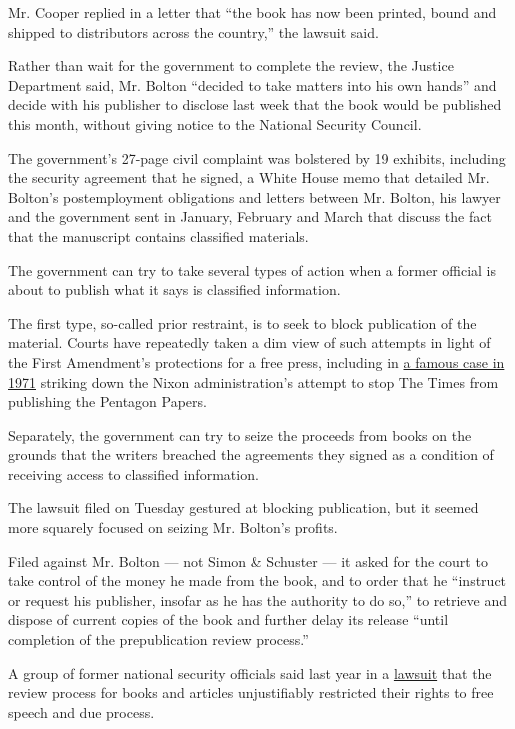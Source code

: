 Mr. Cooper replied in a letter that ``the book has now been printed,
bound and shipped to distributors across the country,'' the lawsuit
said.

Rather than wait for the government to complete the review, the Justice
Department said, Mr. Bolton ``decided to take matters into his own
hands'' and decide with his publisher to disclose last week that the
book would be published this month, without giving notice to the
National Security Council.

The government's 27-page civil complaint was bolstered by 19 exhibits,
including the security agreement that he signed, a White House memo that
detailed Mr. Bolton's postemployment obligations and letters between Mr.
Bolton, his lawyer and the government sent in January, February and
March that discuss the fact that the manuscript contains classified
materials.

The government can try to take several types of action when a former
official is about to publish what it says is classified information.

The first type, so-called prior restraint, is to seek to block
publication of the material. Courts have repeatedly taken a dim view of
such attempts in light of the First Amendment's protections for a free
press, including in \href{https://www.oyez.org/cases/1970/1873}{a famous
case in 1971} striking down the Nixon administration's attempt to stop
The Times from publishing the Pentagon Papers.

Separately, the government can try to seize the proceeds from books on
the grounds that the writers breached the agreements they signed as a
condition of receiving access to classified information.

The lawsuit filed on Tuesday gestured at blocking publication, but it
seemed more squarely focused on seizing Mr. Bolton's profits.

Filed against Mr. Bolton --- not Simon \& Schuster --- it asked for the
court to take control of the money he made from the book, and to order
that he ``instruct or request his publisher, insofar as he has the
authority to do so,'' to retrieve and dispose of current copies of the
book and further delay its release ``until completion of the
prepublication review process.''

A group of former national security officials said last year in a
\href{https://www.nytimes.com/2019/04/02/us/politics/prepublication-censorship-system.html}{lawsuit}
that the review process for books and articles unjustifiably restricted
their rights to free speech and due process.


